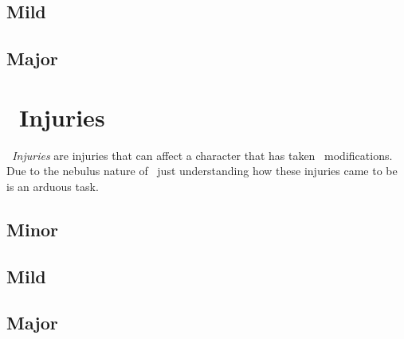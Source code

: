 \subsection{Mild}
\begin{multicols}{2}

\end{multicols}
\subsection{Major}
\begin{multicols}{2}
\end{multicols}

\section{\magit\ Injuries}\label{sec:magi_injuries}
\emph{\magit\ Injuries} are injuries that can affect a character that has taken \magit\ modifications. Due to the nebulus nature of \magit\ just understanding how these injuries came to be is an arduous task.

\subsection{Minor}
\begin{multicols}{2}
\end{multicols}
\subsection{Mild}
\begin{multicols}{2}
\end{multicols}
\subsection{Major}
\begin{multicols}{2}
\end{multicols}